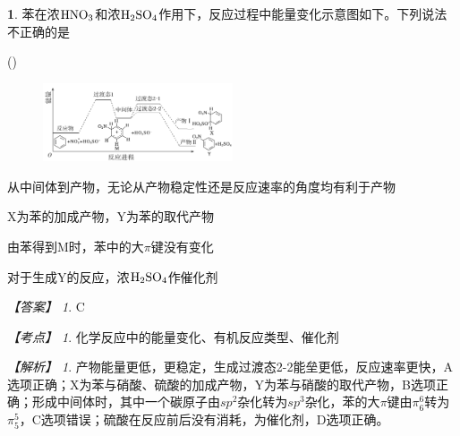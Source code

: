 \documentclass[UTF8, 10pt, a4paper, oneside]{ctexart}
\newcommand{\fs}[1]{{\fangsong #1}}%
\newcommand{\Romannumeral}[1]{\uppercase\expandafter{\romannumeral#1}}%
\theoremstyle{definition}
\newtheorem{subexercise}{}[exercise]%
\theoremstyle{remark}
\newtheorem*{answer}{【答案】}
\newtheorem*{point}{【考点】}      %
\newtheorem*{explanation}{【解析】}     %
\theoremstyle{plain}
\begin{document}
\begin{subexercise}
    \fs{[2024·北京卷，13]}苯在浓$\ce{HNO3}$和浓$\ce{H2SO4}$作用下，反应过程中能量变化示意图如下。下列说法不正确的是\vspace{-1em}
    \begin{flushright}
        (\quad)
    \end{flushright}\vspace{-2em}
    \begin{figure}[h!]
        \centering
        \includegraphics[width=0.5\textwidth]{assists/image12.png}
    \end{figure}
    \begin{adjustwidth}{4em}{}
        \begin{asparaenum}[A. ]
            \item 从中间体到产物，无论从产物稳定性还是反应速率的角度均有利于产物\Romannumeral{2}
            \item X为苯的加成产物，Y为苯的取代产物
            \item 由苯得到M时，苯中的大$\pi$键没有变化
            \item 对于生成Y的反应，浓$\ce{H2SO4}$作催化剂
        \end{asparaenum}
    \end{adjustwidth}
    \begin{answer}
        C
    \end{answer}
    \begin{point}
        化学反应中的能量变化、有机反应类型、催化剂
    \end{point}
    \begin{explanation}
        产物\Romannumeral{2}能量更低，更稳定，生成过渡态2-2能垒更低，反应速率更快，A选项正确；X为苯与硝酸、硫酸的加成产物，Y为苯与硝酸的取代产物，B选项正确；形成中间体时，其中一个碳原子由$sp^2$杂化转为$sp^3$杂化，苯的大$\pi$键由$\pi^6_6$转为$\pi^5_5$，C选项错误；硫酸在反应前后没有消耗，为催化剂，D选项正确。
    \end{explanation}
\end{subexercise}
\end{document}
